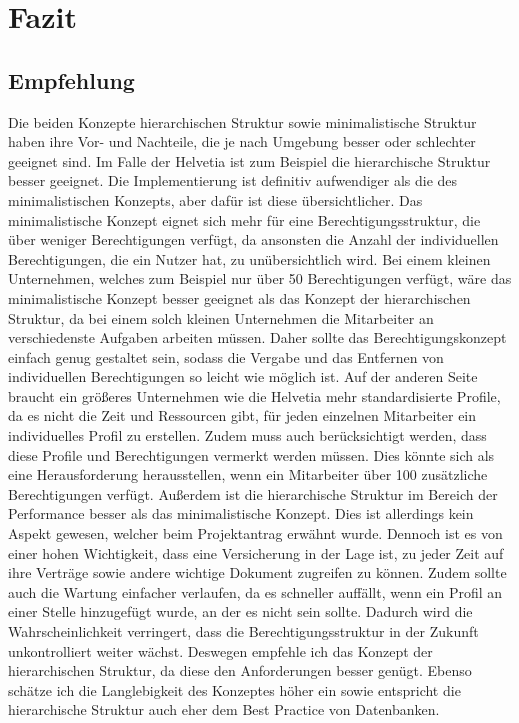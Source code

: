 \chapter{Fazit}
\label{ch:chapter06}

\section{Empfehlung}
\label{sec:chapter06}
Die beiden Konzepte hierarchischen Struktur sowie minimalistische Struktur haben ihre Vor- und Nachteile, die je nach Umgebung besser oder schlechter geeignet sind.
Im Falle der Helvetia ist zum Beispiel die hierarchische Struktur besser geeignet.
\newline
Die Implementierung ist definitiv aufwendiger als die des minimalistischen Konzepts, aber dafür ist diese übersichtlicher.
Das minimalistische Konzept eignet sich mehr für eine Berechtigungsstruktur, die über weniger Berechtigungen verfügt, da ansonsten die Anzahl der individuellen Berechtigungen, die ein Nutzer hat, zu unübersichtlich wird.
Bei einem kleinen Unternehmen, welches zum Beispiel nur über 50 Berechtigungen verfügt, wäre das minimalistische Konzept besser geeignet als das Konzept der hierarchischen Struktur, da bei einem solch kleinen Unternehmen die Mitarbeiter an verschiedenste Aufgaben arbeiten müssen.
Daher sollte das Berechtigungskonzept einfach genug gestaltet sein, sodass die Vergabe und das Entfernen von individuellen Berechtigungen so leicht wie möglich ist.
Auf der anderen Seite braucht ein größeres Unternehmen wie die Helvetia mehr standardisierte Profile, da es nicht die Zeit und Ressourcen gibt, für jeden einzelnen Mitarbeiter ein individuelles Profil zu erstellen.
Zudem muss auch berücksichtigt werden, dass diese Profile und Berechtigungen vermerkt werden müssen.
Dies könnte sich als eine Herausforderung herausstellen, wenn ein Mitarbeiter über 100 zusätzliche Berechtigungen verfügt.
\newline
Außerdem ist die hierarchische Struktur im Bereich der Performance besser als das minimalistische Konzept.
Dies ist allerdings kein Aspekt gewesen, welcher beim Projektantrag erwähnt wurde.
Dennoch ist es von einer hohen Wichtigkeit, dass eine Versicherung in der Lage ist, zu jeder Zeit auf ihre Verträge sowie andere wichtige Dokument zugreifen zu können.
\newline
Zudem sollte auch die Wartung einfacher verlaufen, da es schneller auffällt, wenn ein Profil an einer Stelle hinzugefügt wurde, an der es nicht sein sollte.
Dadurch wird die Wahrscheinlichkeit verringert, dass die Berechtigungsstruktur in der Zukunft unkontrolliert weiter wächst.
Deswegen empfehle ich das Konzept der hierarchischen Struktur, da diese den Anforderungen besser genügt.
Ebenso schätze ich die Langlebigkeit des Konzeptes höher ein sowie entspricht die hierarchische Struktur auch eher dem Best Practice von Datenbanken.
\newpage

